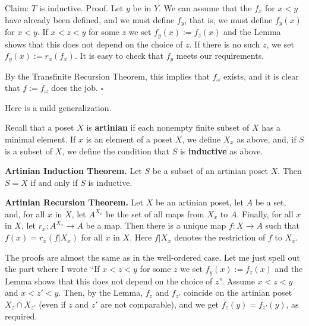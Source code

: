 \documentclass[12pt,letterpaper]{article}
\newcommand{\nn}{\noindent}
\begin{document}
\nn Claim: $T$ is inductive. Proof. Let $y$ be in $Y$. We can assume that the $f_x$ for $x<y$ have already been defined, and we must define $f_y$, that is, we must define $f_y(x)$ for $x<y$. If $x<z<y$ for some $z$ we set $f_y(x):=f_z(x)$ and the Lemma shows that this does not depend on the choice of $z$. If there is no such $z$, we set $f_y(x):=r_x(f_x)$. It is easy to check that $f_y$ meets our requirements. 

By the Transfinite Recursion Theorem, this implies that $f_\omega$ exists, and it is clear that $f:=f_\omega$ does the job. $\square$ 

Here is a mild generalization. %

Recall that a poset $X$ is \textbf{artinian} if each nonempty finite subset of $X$ has a minimal element. If $x$ is an element of a poset $X$, we define $X_x$ as above, and, if $S$ is a subset of $X$, we define the condition that $S$ is \textbf{inductive} as above. 


\nn\textbf{Artinian Induction Theorem.} Let $S$ be a subset of an artinian poset $X$. Then $S=X$ if and only if $S$ is inductive. \pagebreak 

\nn\textbf{Artinian Recursion Theorem.} Let $X$ be an artinian poset, let $A$ be a set, and, for all $x$ in $X$, let $A^{X_x}$ be the set of all maps from $X_x$ to $A$. Finally, for all $x$ in $X$, let $r_x:A^{X_x}\to A$ be a map. Then there is a unique map $f:X\to A$ such that $f(x)=r_x(f|X_x)$ for all $x$ in $X$. Here $f|X_x$ denotes the restriction of $f$ to $X_x$. 

The proofs are almost the same as in the well-ordered case. Let me just spell out the part where I wrote ``If $x<z<y$ for some $z$ we set $f_y(x):=f_z(x)$ and the Lemma shows that this does not depend on the choice of $z$''. Assume $x<z<y$ and $x<z'<y$. Then, by the Lemma, $f_z$ and $f_{z'}$ coincide on the artinian poset $X_z\cap X_{z'}$ (even if $z$ and $z'$ are not comparable), and we get $f_z(y)=f_{z'}(y)$, as required. 
\end{document}
